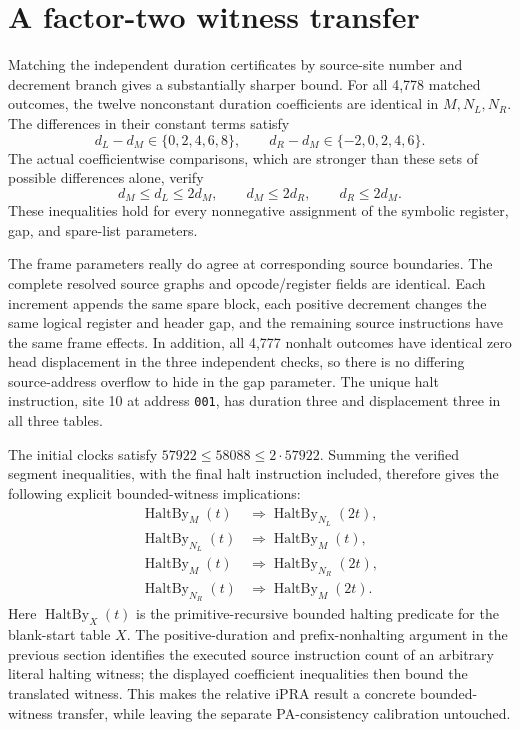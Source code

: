 \section{A factor-two witness transfer}

Matching the independent duration certificates by source-site number and
decrement branch gives a substantially sharper bound.  For all 4,778
matched outcomes, the twelve nonconstant duration coefficients are identical
in $M,N_L,N_R$.  The differences in their constant terms satisfy
\[
 d_L-d_M\in\{0,2,4,6,8\},\qquad
 d_R-d_M\in\{-2,0,2,4,6\}.
\]
The actual coefficientwise comparisons, which are stronger than these
sets of possible differences alone, verify
\[
 d_M\le d_L\le2d_M,\qquad
 d_M\le2d_R,\qquad d_R\le2d_M.
\]
These inequalities hold for every nonnegative assignment of the symbolic
register, gap, and spare-list parameters.

The frame parameters really do agree at corresponding source boundaries.
The complete resolved source graphs and opcode/register fields are
identical.  Each increment appends the same spare block, each positive
decrement changes the same logical register and header gap, and the
remaining source instructions have the same frame effects.  In addition,
all 4,777 nonhalt outcomes have identical zero head displacement in the
three independent checks, so there is no differing source-address overflow
to hide in the gap parameter.  The unique halt instruction, site 10 at
address \texttt{001}, has duration three and displacement three in all
three tables.

The initial clocks satisfy $57922\le58088\le2\cdot57922$.  Summing the
verified segment inequalities, with the final halt instruction included,
therefore gives the following explicit bounded-witness implications:
\[
\begin{aligned}
 \operatorname{HaltBy}_M(t)&\Longrightarrow
     \operatorname{HaltBy}_{N_L}(2t),\\
 \operatorname{HaltBy}_{N_L}(t)&\Longrightarrow
     \operatorname{HaltBy}_M(t),\\
 \operatorname{HaltBy}_M(t)&\Longrightarrow
     \operatorname{HaltBy}_{N_R}(2t),\\
 \operatorname{HaltBy}_{N_R}(t)&\Longrightarrow
     \operatorname{HaltBy}_M(2t).
\end{aligned}
\]
Here $\operatorname{HaltBy}_X(t)$ is the primitive-recursive bounded
halting predicate for the blank-start table $X$.  The positive-duration
and prefix-nonhalting argument in the previous section identifies the
executed source instruction count of an arbitrary literal halting witness;
the displayed coefficient inequalities then bound the translated witness.
This makes the relative iPRA result a concrete bounded-witness transfer,
while leaving the separate PA-consistency calibration untouched.

